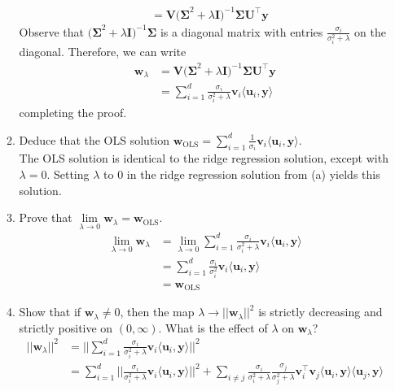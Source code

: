 \documentclass{article}
\begin{document}
\begin{enumerate}[label=\arabic*.]
\begin{enumerate}
{\begin{align*}
		&= \mathbf{V(\Sigma}^2 + \lambda\mathbf{I})^{-1}\mathbf{\Sigma U^{\top}y}
		\end{align*} Observe that $\mathbf{(\Sigma}^2 + \lambda\mathbf{I})^{-1}\mathbf{\Sigma}$ is a diagonal matrix with entries $\frac{\sigma_i}{\sigma_i^2 + \lambda}$ on the diagonal. Therefore, we can write \begin{align*}
		\mathbf{w}_\lambda &= \mathbf{V(\Sigma}^2 + \lambda\mathbf{I})^{-1}\mathbf{\Sigma U^{\top}y} \\
		&= \sum\limits_{i = 1}^d \frac{\sigma_i}{\sigma_i^2 + \lambda}\mathbf{v}_i\langle \mathbf{u}_i, \mathbf{y} \rangle
		\end{align*} completing the proof.}
		\item Deduce that the OLS solution $\mathbf{w}_{\text{OLS}} = \sum\limits_{i=1}^d \frac{1}{\sigma_i} \mathbf{v}_i\langle \mathbf{u}_i, \mathbf{y} \rangle$. \\
		{\color{blue} The OLS solution is identical to the ridge regression solution, except with $\lambda = 0$. Setting $\lambda$ to 0 in the ridge regression solution from (a) yields this solution.}
		\item Prove that $\lim\limits_{\lambda \rightarrow 0} \mathbf{w}_\lambda = \mathbf{w}_\text{OLS}$. \\
		{\color{blue} \begin{align*}
		\lim\limits_{\lambda \rightarrow 0} \mathbf{w}_\lambda &= \lim\limits_{\lambda \rightarrow 0} \sum\limits_{i = 1}^d \frac{\sigma_i}{\sigma_i^2 + \lambda}\mathbf{v}_i\langle \mathbf{u}_i, \mathbf{y} \rangle \\
		&= \sum\limits_{i = 1}^d \frac{\sigma_i}{\sigma_i^2}\mathbf{v}_i\langle \mathbf{u}_i, \mathbf{y} \rangle \\
		&= \mathbf{w}_{\text{OLS}}
		\end{align*}}
		\item Show that if $\mathbf{w}_\lambda \neq 0$, then the map $\lambda \rightarrow ||\mathbf{w}_\lambda ||^2$ is strictly decreasing and strictly positive on $(0, \infty)$. What is the effect of $\lambda$ on $\mathbf{w}_\lambda$? \\
		{\color{blue} \begin{align*}
		||\mathbf{w}_\lambda ||^2 &= ||\sum\limits_{i = 1}^d \frac{\sigma_i}{\sigma_i^2 + \lambda}\mathbf{v}_i\langle \mathbf{u}_i, \mathbf{y} \rangle||^2 \\
		&= \sum\limits_{i = 1}^d ||\frac{\sigma_i}{\sigma_i^2 + \lambda}\mathbf{v}_i\langle \mathbf{u}_i, \mathbf{y} \rangle||^2 + \sum\limits_{i \neq j} \frac{\sigma_i}{\sigma_i^2 + \lambda}\frac{\sigma_j}{\sigma_j^2 + \lambda} \mathbf{v}_i^{\top}\mathbf{v}_j \langle \mathbf{u}_i, \mathbf{y} \rangle\langle \mathbf{u}_j, \mathbf{y} \rangle \\

\end{align*}}
\end{enumerate}
\end{enumerate}
\end{document}
